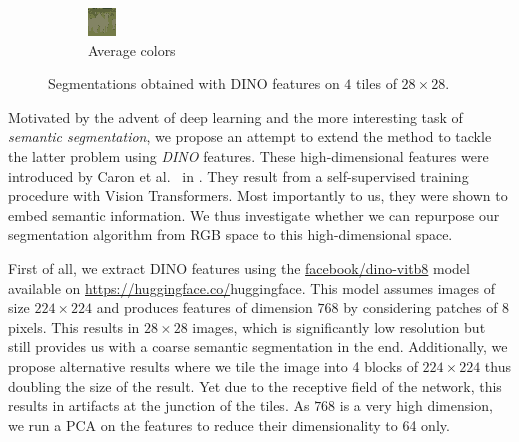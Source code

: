 \documentclass[11pt,a4paper]{article}
\begin{document}
\begin{figure}
\begin{subfigure}[b]{0.3\textwidth}
        \includegraphics[width=\textwidth]{figures/dino/tile_2/253027_avg.png}
        \caption{Average colors}
    \end{subfigure}
       \caption{Segmentations obtained with DINO features on $4$ tiles of $28\times 28$.}
       \label{fig:results-dino-tile2}
\end{figure}

Motivated by the advent of deep learning and the more interesting task of \textit{semantic segmentation}, we propose an attempt to extend the method to tackle the latter problem using \textit{DINO} features. These high-dimensional features were introduced by Caron et al.~ in \cite{dino}. They result from a self-supervised training procedure with Vision Transformers\cite{transformers}. Most importantly to us, they were shown to embed semantic information. We thus investigate whether we can repurpose our segmentation algorithm from RGB space to this high-dimensional space.

First of all, we extract DINO features using the \href{https://huggingface.co/facebook/dino-vitb8}{facebook/dino-vitb8} model available on \url{https://huggingface.co/}{huggingface}. This model assumes images of size $224\times 224$ and produces features of dimension $768$ by considering patches of 8 pixels. This results in $28\times 28$ images, which is significantly low resolution but still provides us with a coarse semantic segmentation in the end. Additionally, we propose alternative results where we tile the image into 4 blocks of $224\times 224$ thus doubling the size of the result. Yet due to the receptive field of the network, this results in artifacts at the junction of the tiles. As $768$ is a very high dimension, we run a PCA on the features to reduce their dimensionality to 64 only.
\end{document}
